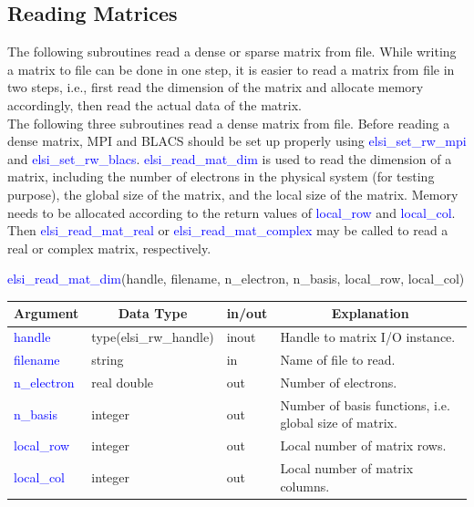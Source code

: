 \documentclass{report}
\begin{document}
\subsection{Reading Matrices}
\label{subsec:rw_read}
The following subroutines read a dense or sparse matrix from file.  While writing a matrix to file can be done in one step, it is easier to read a matrix from file in two steps, i.e., first read the dimension of the matrix and allocate memory accordingly, then read the actual data of the matrix.\\

The following three subroutines read a dense matrix from file.  Before reading a dense matrix, MPI and BLACS should be set up properly using \textcolor{blue}{elsi\_set\_rw\_mpi} and \textcolor{blue}{elsi\_set\_rw\_blacs}.  \textcolor{blue}{elsi\_read\_mat\_dim} is used to read the dimension of a matrix, including the number of electrons in the physical system (for testing purpose), the global size of the matrix, and the local size of the matrix.  Memory needs to be allocated according to the return values of \textcolor{blue}{local\_row} and \textcolor{blue}{local\_col}.  Then \textcolor{blue}{elsi\_read\_mat\_real} or \textcolor{blue}{elsi\_read\_mat\_complex} may be called to read a real or complex matrix, respectively.\\

\newpage
\begin{labeling}{\hspace{6cm}}
\item [\hspace{0.3cm} \textcolor{blue}{elsi\_read\_mat\_dim}(handle, filename, n\_electron, n\_basis, local\_row, local\_col)]
\end{labeling}

\begin{tabular}[]{|p{20mm}|p{45mm}|p{15mm}|p{85mm}|}
\hline
\multicolumn{1}{|c|}{\textbf{Argument}} & \multicolumn{1}{c|}{\textbf{Data Type}} & \multicolumn{1}{c|}{\textbf{in/out}} & \multicolumn{1}{c|}{\textbf{Explanation}}\\
\hline
\textcolor{blue}{handle}      & type(elsi\_rw\_handle) & inout & Handle to matrix I/O instance.\\
\hline
\textcolor{blue}{filename}    & string                 & in    & Name of file to read.\\
\hline
\textcolor{blue}{n\_electron} & real double            & out   & Number of electrons.\\
\hline
\textcolor{blue}{n\_basis}    & integer                & out   & Number of basis functions, i.e. global size of matrix.\\
\hline
\textcolor{blue}{local\_row}  & integer                & out   & Local number of matrix rows.\\
\hline
\textcolor{blue}{local\_col}  & integer                & out   & Local number of matrix columns.\\
\hline
\end{tabular}
\end{document}
